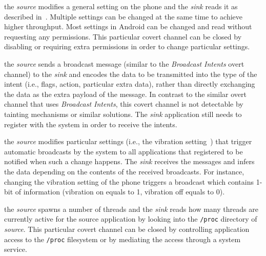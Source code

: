  the \emph{source}
modifies a general setting on the phone and the \emph{sink} reads it
as described in~\cite{soundcomber-ndss}. Multiple settings can be
changed at the same time to achieve higher throughput. Most settings
in Android can be changed and read without requesting any
permissions. This particular covert channel can be closed by disabling
or requiring extra permissions in order to change particular settings.

 the \emph{source} sends a
broadcast message (similar to the \emph{Broadcast Intents} overt
channel) to the \emph{sink} and encodes the data to be transmitted
into the type of the intent (i.e., flags, action, particular extra
data), rather than directly exchanging the data as the extra payload
of the message. In contrast to the similar overt channel that uses
\emph{Broadcast Intents}, this covert channel is not detectable by
tainting mechanisms or similar solutions. The \emph{sink} application
still needs to register with the system in order to receive the
intents.

 the \emph{source} modifies
particular settings (i.e., the vibration
setting~\cite{soundcomber-ndss}) that trigger automatic broadcasts by
the system to all applications that registered to be notified when
such a change happens. The \emph{sink} receives the messages and
infers the data depending on the contents of the received
broadcasts. For instance, changing the vibration setting of the phone
triggers a broadcast which contains 1-bit of information (vibration on
equals to 1, vibration off equals to 0).

 the \emph{source} spawns a number of
threads and the \emph{sink} reads how many threads are currently
active for the source application by looking into the \texttt{/proc}
directory of \emph{source}. This particular covert channel can be
closed by controlling application access to the \texttt{/proc}
filesystem or by mediating the access through a system service.

